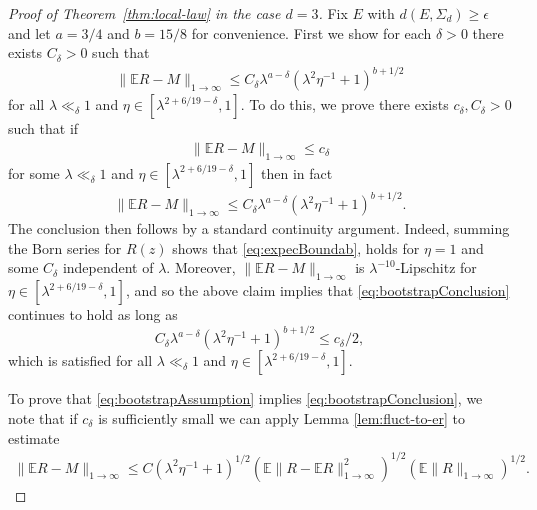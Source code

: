 \documentclass[11pt]{amsart}
\def\Expec{{\mathbb E}}
\numberwithin{equation}{section}
\numberwithin{theorem}{section}
\begin{document}
\begin{proof}[Proof of Theorem~\ref{thm:local-law} in the case $d=3$]
Fix $E$ with $d(E,\Sigma_d)\geq \epsilon$ and let  $a=3 /4$ and $b=15 / 8$ for convenience.
First we show for each $\delta>0$ there exists $C_\delta>0$ such that
\begin{align}
\label{eq:expecBoundab}
\|\Expec R-M\|_{1\to \infty}\leq
C_{\delta}\lambda^{a-\delta}(\lambda^{2} \eta^{-1}+1)^{b+1 /2}
\end{align}
for all $\lambda \ll_{\delta}1$ and $\eta\in [\lambda^{2+6/19-\delta},1]$.
To do this, we prove there exists $c_{\delta}, C_{\delta}>0$ such that if
\begin{align}
\label{eq:bootstrapAssumption}
\|\Expec R - M\|_{1\to \infty}\leq c_{\delta}
\end{align}
for some $\lambda \ll_{\delta}1$ and $\eta\in [\lambda^{2+6/19-\delta},1]$ then in fact
\begin{align}
\label{eq:bootstrapConclusion}
\|\Expec R - M\|_{1\to \infty}\leq
C_{\delta}\lambda^{a-\delta}(\lambda^2\eta^{-1}+1)^{b+1 /2}.
\end{align}
The conclusion then follows by a standard continuity argument.
Indeed, summing the Born series for $R(z)$ shows that \eqref{eq:expecBoundab}, holds for $\eta= 1$ and some $C_{\delta}$ independent of $\lambda$.
Moreover, $\|\mathbb{E}R-M\|_{1\to\infty}$ is  $\lambda^{-10}$-Lipschitz for $\eta\in [\lambda^{2+6/19-\delta},1]$,
and so the above claim implies that \eqref{eq:bootstrapConclusion} continues to hold as long as
$$C_{\delta}\lambda^{a-\delta}(\lambda^2\eta^{-1}+1)^{b+1 /2}\leq c_{\delta}/2,$$
which is satisfied for all $\lambda \ll_{\delta}1$ and $\eta\in [\lambda^{2+6/19-\delta},1]$.

To prove that \eqref{eq:bootstrapAssumption} implies \eqref{eq:bootstrapConclusion}, we note that
if $c_{\delta}$ is sufficiently small we can apply Lemma
\ref{lem:fluct-to-er} to estimate
\begin{align}
\label{eq:FluctuationsBoundExpec}
\|\Expec R-M \|_{1\to \infty}\leq
C(\lambda^2\eta^{-1}+1)^{1/ 2} \left(  \Expec \|R-\Expec R\|_{1\to \infty}^{2}\right) ^{1/ 2}
\left( \Expec\|R\|_{1\to \infty} \right)^{1 /2}.
\end{align}


\end{proof}
\end{document}
